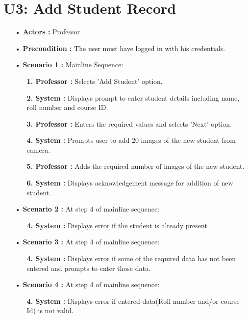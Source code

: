 \documentclass{scrreprt}
\begin{document}
\section{U3: Add Student Record}
\begin{itemize}
\item [•] \textbf{Actors :} Professor
\item[•] \textbf{Precondition :} The user must have logged in with his credentials.
\item [•] \textbf{Scenario 1 :} Mainline Sequence:
\begin{itemize}
\item [] \textbf{1. Professor :} Selects 'Add Student' option.
\item [] \textbf{2. System :} Displays prompt to enter student details including name, roll number and course ID.
\item [] \textbf{3. Professor :} Enters the required values and selects 'Next' option.
\item [] \textbf{4. System :} Prompts user to add 20 images of the new student from camera.
\item [] \textbf{5. Professor :} Adds the required number of images of the new student.
\item [] \textbf{6. System :} Displays acknowledgement message for addition of new student.
\end{itemize}
\item [•] \textbf{Scenario 2 :} At step 4 of mainline sequence:
\begin{itemize}
\item [] \textbf{4. System :} Displays error if the student is already present.
\end{itemize}
\item [•] \textbf{Scenario 3 :} At step 4 of mainline sequence:
\begin{itemize}
\item [] \textbf{4. System :} Displays error if some of the required data has not been entered and prompts to enter those data.
\end{itemize}
\item [•] \textbf{Scenario 4 :} At step 4 of mainline sequence:
\begin{itemize}
\item [] \textbf{4. System :} Displays error if entered data(Roll number and/or course Id) is not valid.
\end{itemize}
\end{itemize}
\end{document}
